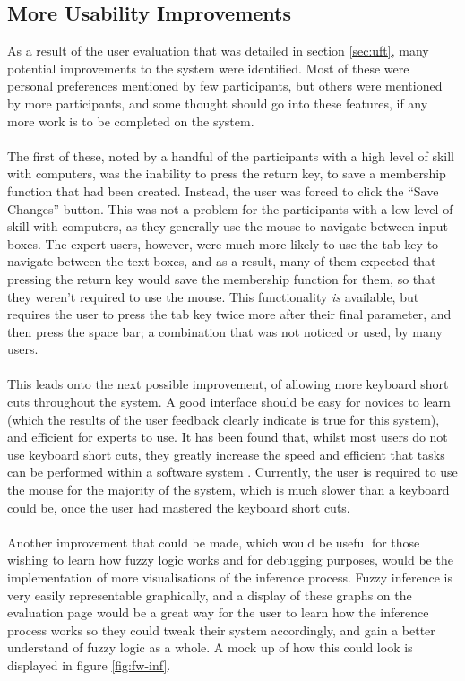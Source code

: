 \subsection{More Usability Improvements}
\vspace{-2mm}
\label{sec:mui}
As a result of the user evaluation that was detailed in section \ref{sec:uft}, many potential improvements to the system were identified. Most of these were personal preferences mentioned by few participants, but others were mentioned by more participants, and some thought should go into these features, if any more work is to be completed on the system.\ \\
\ \\
The first of these, noted by a handful of the participants with a high level of skill with computers, was the inability to press the return key, to save a membership function that had been created. Instead, the user was forced to click the ``Save Changes'' button. This was not a problem for the participants with a low level of skill with computers, as they generally use the mouse to navigate between input boxes. The expert users, however, were much more likely to use the tab key to navigate between the text boxes, and as a result, many of them expected that pressing the return key would save the membership function for them, so that they weren't required to use the mouse. This functionality \emph{is} available, but requires the user to press the tab key twice more after their final parameter, and then press the space bar; a combination that was not noticed or used, by many users. \ \\
\ \\
This leads onto the next possible improvement, of allowing more keyboard short cuts throughout the system. A good interface should be easy for novices to learn (which the results of the user feedback clearly indicate is true for this system), and efficient for experts to use. It has been found that, whilst most users do not use keyboard short cuts, they greatly increase the speed and efficient that tasks can be performed within a software system \cite{lane2005hidden}. Currently, the user is required to use the mouse for the majority of the system, which is much slower than a keyboard could be, once the user had mastered the keyboard short cuts.\ \\
\ \\
Another improvement that could be made, which would be useful for those wishing to learn how fuzzy logic works and for debugging purposes, would be the implementation of more visualisations of the inference process. Fuzzy inference is very easily representable graphically, and a display of these graphs on the evaluation page would be a great way for the user to learn how the inference process works so they could tweak their system accordingly, and gain a better understand of fuzzy logic as a whole. A mock up of how this could look is displayed in figure \ref{fig:fw-inf}.

